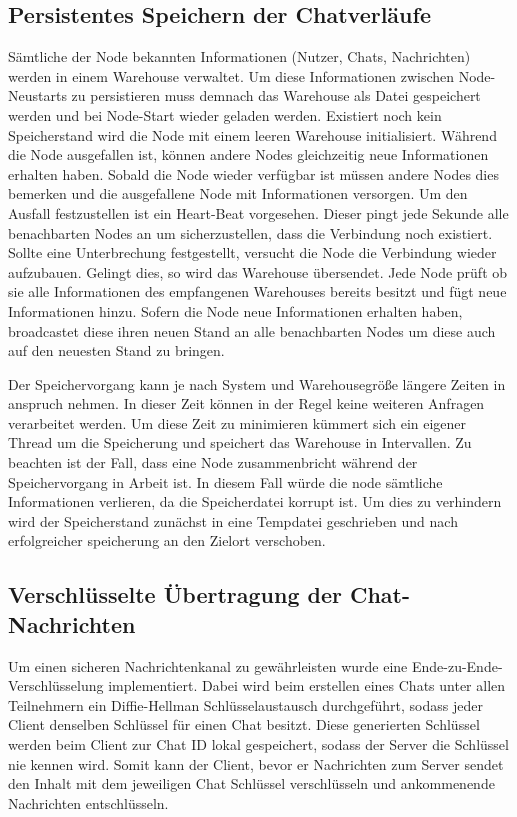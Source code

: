 \subsection{Persistentes Speichern der Chatverläufe}
Sämtliche der Node bekannten Informationen (Nutzer, Chats, Nachrichten) werden in einem Warehouse verwaltet. Um diese Informationen zwischen Node-Neustarts zu persistieren muss demnach das Warehouse als Datei gespeichert werden und bei Node-Start wieder geladen werden. Existiert noch kein Speicherstand wird die Node mit einem leeren Warehouse initialisiert. Während die Node ausgefallen ist, können andere Nodes gleichzeitig neue Informationen erhalten haben. Sobald die Node wieder verfügbar ist müssen andere Nodes dies bemerken und die ausgefallene Node mit Informationen versorgen. Um den Ausfall festzustellen ist ein Heart-Beat vorgesehen. Dieser pingt jede Sekunde alle benachbarten Nodes an um sicherzustellen, dass die Verbindung noch existiert. Sollte eine Unterbrechung festgestellt, versucht die Node die Verbindung wieder aufzubauen. Gelingt dies, so wird das Warehouse übersendet. Jede Node prüft ob sie alle Informationen des empfangenen Warehouses bereits besitzt und fügt neue Informationen hinzu. Sofern die Node neue Informationen erhalten haben, broadcastet diese ihren neuen Stand an alle benachbarten Nodes um diese auch auf den neuesten Stand zu bringen.

Der Speichervorgang kann je nach System und Warehousegröße längere Zeiten in anspruch nehmen. In dieser Zeit können in der Regel keine weiteren Anfragen verarbeitet werden. Um diese Zeit zu minimieren kümmert sich ein eigener Thread um die Speicherung und speichert das Warehouse in Intervallen.
Zu beachten ist der Fall, dass eine Node zusammenbricht während der Speichervorgang in Arbeit ist. In diesem Fall würde die node sämtliche Informationen verlieren, da die Speicherdatei korrupt ist. Um dies zu verhindern wird der Speicherstand zunächst in eine Tempdatei geschrieben und nach erfolgreicher speicherung an den Zielort verschoben.

\subsection{Verschlüsselte Übertragung der Chat-Nachrichten}
Um einen sicheren Nachrichtenkanal zu gewährleisten wurde eine 
Ende-zu-Ende-Verschlüsselung implementiert. Dabei wird beim
erstellen eines Chats unter allen Teilnehmern ein Diffie-Hellman 
Schlüsselaustausch durchgeführt, sodass jeder Client denselben 
Schlüssel für einen Chat besitzt. Diese generierten Schlüssel 
werden beim Client zur Chat ID lokal gespeichert, sodass der
Server die Schlüssel nie kennen wird. Somit kann der Client,
bevor er Nachrichten zum Server sendet den Inhalt mit dem 
jeweiligen Chat Schlüssel verschlüsseln und ankommenende 
Nachrichten entschlüsseln.

